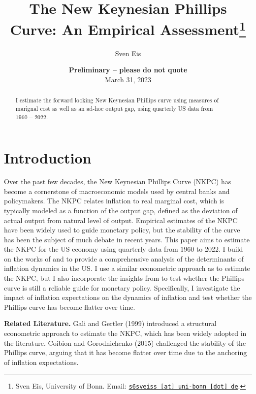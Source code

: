 \documentclass[11pt, a4paper, leqno]{article}
\begin{document}
\title{The New Keynesian Phillips Curve: An Empirical Assessment\thanks{Sven Eis, University of Bonn. Email: \href{mailto:s6sveiss@uni-bonn.de}{\nolinkurl{s6sveiss [at] uni-bonn [dot] de}}.}}

\author{Sven Eis}

\date{
    {\bf Preliminary -- please do not quote}
    \\[1ex]
    March 31, 2023
}

\maketitle


\begin{abstract}
    I estimate the forward looking New Keynesian Phillips curve using measures of marignal cost as well as an ad-hoc output gap, using quarterly US data from $1960-2022$.
\end{abstract}

\clearpage


\section{Introduction} %
\label{sec:introduction}
Over the past few decades, the New Keynesian Phillips Curve (NKPC) has become a cornerstone of macroeconomic models used by central banks and policymakers. The NKPC relates inflation to real marginal cost, which is typically modeled as a function of the output gap, defined as the deviation of actual output from natural level of output. Empirical estimates of the NKPC have been widely used to guide monetary policy, but the stability of the curve has been the subject of much debate in recent years.
This paper aims to estimate the NKPC for the US economy using quarterly data from 1960 to 2022. I build on the works of \citet{gali1999inflation} and \citet{coibion2015phillips} to provide a comprehensive analysis of the determinants of inflation dynamics in the US.
I use a similar econometric approach as \citet{gali1999inflation} to estimate the NKPC, but I also incorporate the insights from \citet{coibion2015phillips} to test whether the Phillips curve is still a reliable guide for monetary policy. Specifically, I investigate the impact of inflation expectations on the dynamics of inflation and test whether the Phillips curve has become flatter over time.

\textbf{Related Literature.} Gali and Gertler (1999) introduced a structural econometric approach to estimate the NKPC, which has been widely adopted in the literature. Coibion and Gorodnichenko (2015) challenged the stability of the Phillips curve, arguing that it has become flatter over time due to the anchoring of inflation expectations.
\end{document}
